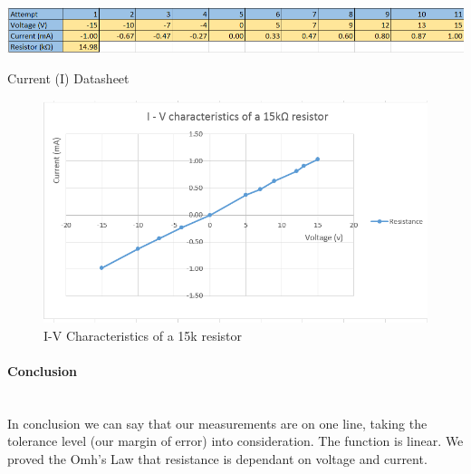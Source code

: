 \begin{table} [H]
	\centering
	\includegraphics[width=1\textwidth]{./images/Kacper/11a.png}
	\caption{Current (I) Datasheet}
	\label{Current (I) Datasheet}
\end{table}

\begin{figure} [H]
	\centering
	\includegraphics[width=1\textwidth]{./images/Kacper/11p.png}
	\caption{I-V Characteristics of a 15k resistor}
	\label{I-V Characteristics of a 15k resistor}
\end{figure}

\paragraph*{Conclusion} \hfill \\
In conclusion we can say that our measurements are on one line, taking the tolerance level (our margin of error) into consideration. The function is linear. We proved the Omh's Law that resistance is dependant on voltage and current.